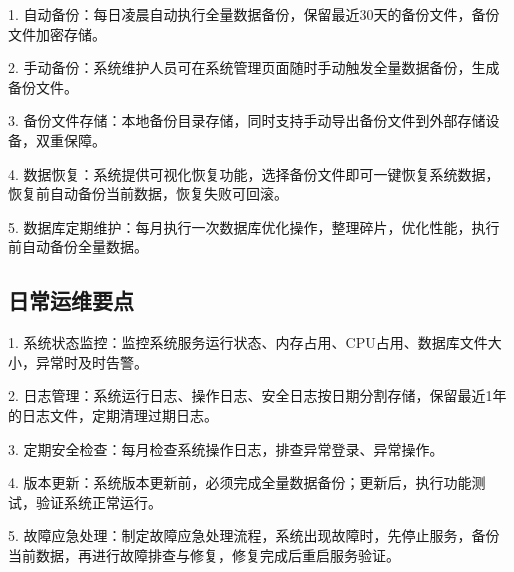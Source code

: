 \documentclass[12pt, a4paper]{article}
\begin{document}
1. 自动备份：每日凌晨自动执行全量数据备份，保留最近30天的备份文件，备份文件加密存储。

2. 手动备份：系统维护人员可在系统管理页面随时手动触发全量数据备份，生成备份文件。

3. 备份文件存储：本地备份目录存储，同时支持手动导出备份文件到外部存储设备，双重保障。

4. 数据恢复：系统提供可视化恢复功能，选择备份文件即可一键恢复系统数据，恢复前自动备份当前数据，恢复失败可回滚。

5. 数据库定期维护：每月执行一次数据库优化操作，整理碎片，优化性能，执行前自动备份全量数据。

\subsection{日常运维要点}

1. 系统状态监控：监控系统服务运行状态、内存占用、CPU占用、数据库文件大小，异常时及时告警。

2. 日志管理：系统运行日志、操作日志、安全日志按日期分割存储，保留最近1年的日志文件，定期清理过期日志。

3. 定期安全检查：每月检查系统操作日志，排查异常登录、异常操作。

4. 版本更新：系统版本更新前，必须完成全量数据备份；更新后，执行功能测试，验证系统正常运行。

5. 故障应急处理：制定故障应急处理流程，系统出现故障时，先停止服务，备份当前数据，再进行故障排查与修复，修复完成后重启服务验证。
\end{document}
